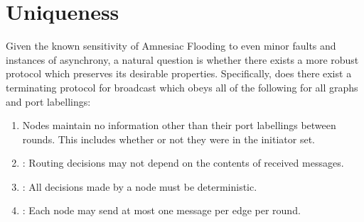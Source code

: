 
\section{Uniqueness}
\label{sec: Uniqueness}
Given the known sensitivity of Amnesiac Flooding to even minor faults and instances of asynchrony, a natural question is whether there exists a more robust protocol which preserves its desirable properties. Specifically, does there exist a terminating protocol for broadcast which obeys all of the following for all graphs and port labellings:
\begin{condition}\;
    \begin{enumerate}
        \label{obs:properties}
        \item  \anew{\StrongTrueStatelessness: }
        Nodes maintain no information other than their port labellings between rounds. This includes whether or not they were in the initiator set.
        \item \Obliviousness: Routing decisions may not depend on the contents of received messages.
        \item \Determinism: All decisions made by a node must be deterministic.
        \item \Bandwidth: Each node may send at most one message per edge per round.
    \end{enumerate}
\end{condition}

